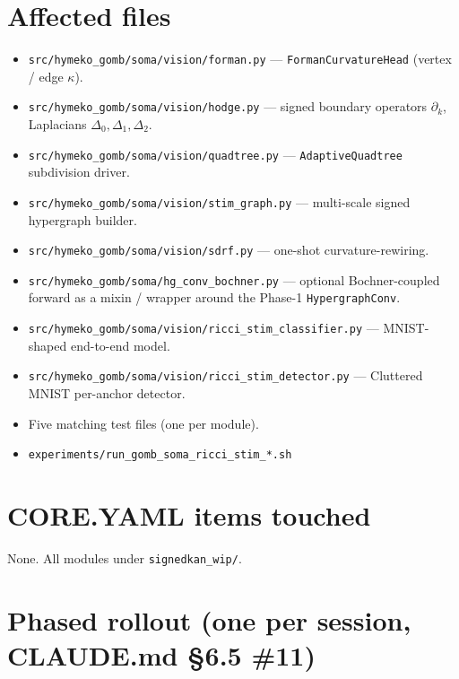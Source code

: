 \documentclass[11pt,a4paper]{article}
\begin{document}
\section{Affected files}

\begin{itemize}
\item \texttt{src/hymeko\_gomb/soma/vision/forman.py} ---
  \texttt{FormanCurvatureHead} (vertex / edge $\kappa$).
\item \texttt{src/hymeko\_gomb/soma/vision/hodge.py} ---
  signed boundary operators $\partial_k$, Laplacians $\Delta_0, \Delta_1, \Delta_2$.
\item \texttt{src/hymeko\_gomb/soma/vision/quadtree.py} ---
  \texttt{AdaptiveQuadtree} subdivision driver.
\item \texttt{src/hymeko\_gomb/soma/vision/stim\_graph.py} ---
  multi-scale signed hypergraph builder.
\item \texttt{src/hymeko\_gomb/soma/vision/sdrf.py} ---
  one-shot curvature-rewiring.
\item \texttt{src/hymeko\_gomb/soma/hg\_conv\_bochner.py} ---
  optional Bochner-coupled forward as a mixin / wrapper around the
  Phase-1 \texttt{HypergraphConv}.
\item \texttt{src/hymeko\_gomb/soma/vision/ricci\_stim\_classifier.py}
  --- MNIST-shaped end-to-end model.
\item \texttt{src/hymeko\_gomb/soma/vision/ricci\_stim\_detector.py}
  --- Cluttered MNIST per-anchor detector.
\item Five matching test files (one per module).
\item \texttt{experiments/run\_gomb\_soma\_ricci\_stim\_*.sh}
\end{itemize}

\section{CORE.YAML items touched}

None. All modules under \texttt{signedkan\_wip/}.

\section{Phased rollout (one per session, CLAUDE.md \S6.5 \#11)}
\end{document}
